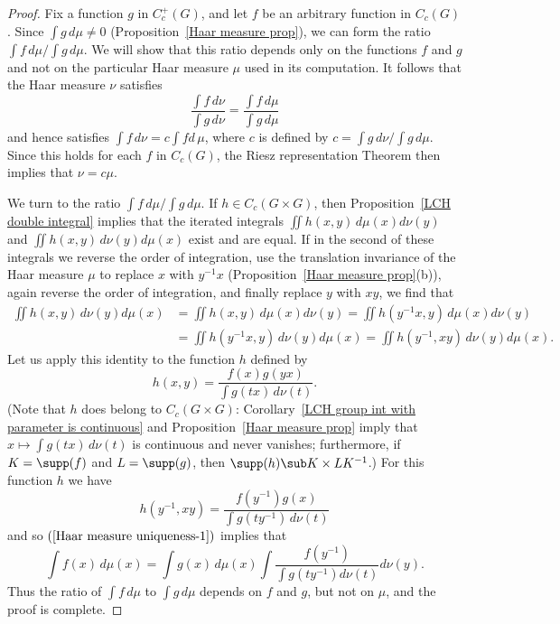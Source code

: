 \begin{proof}
Fix a function $g$ in $C_c^+(G)$, and let $f$ be an arbitrary function in $C_c(G)$. Since $\int g\,d\mu\neq 0$ (Proposition~\ref{Haar measure prop}), we can form the ratio $\int f\,d\mu/\int g\,d\mu$. We will show that this ratio depends only on the functions $f$ and $g$ and not on the particular Haar measure $\mu$ used in its computation. It follows that the
Haar measure $\nu$ satisfies
\[\frac{\int f\,d\nu}{\int g\,d\nu}=\frac{\int f\,d\mu}{\int g\,d\mu}\]
and hence satisfies $\int f\,d\nu=c\int fd\,\mu$, where $c$ is defined by $c=\int g\,d\nu/\int g\,d\mu$. Since this holds for each $f$ in $C_c(G)$, the Riesz representation Theorem then implies that $\nu=c\mu$.\par
We turn to the ratio $\int f\,d\mu/\int g\,d\mu$. If $h\in C_c(G\times G)$, then Proposition~\ref{LCH double integral} implies that the iterated integrals $\iint h(x,y)\,d\mu(x)d\nu(y)$ and $\iint h(x,y)\,d\nu(y)d\mu(x)$ exist and are equal. If in the second of these integrals we reverse the order of integration, use the translation invariance of the Haar measure $\mu$ to replace $x$ with $y^{-1}x$ (Proposition~\ref{Haar measure prop}(b)), again reverse the order of integration, and finally replace $y$ with $xy$, we find that
\begin{equation}\label{Haar measure uniqueness-1}
\begin{aligned}
\iint h(x,y)\,d\nu(y)d\mu(x)&=\iint h(x,y)\,d\mu(x)d\nu(y)=\iint h(y^{-1}x,y)\,d\mu(x)d\nu(y)\\
&=\iint h(y^{-1}x,y)\,d\nu(y)d\mu(x)=\iint h(y^{-1},xy)\,d\nu(y)d\mu(x).
\end{aligned}
\end{equation}
Let us apply this identity to the function $h$ defined by
\[h(x,y)=\frac{f(x)g(yx)}{\int g(tx)\,d\nu(t)}.\]
(Note that $h$ does belong to $C_c(G\times G)$: Corollary~\ref{LCH group int with parameter is continuous} and Proposition~\ref{Haar measure prop} imply that $x\mapsto\int g(tx)\,d\nu(t)$ is continuous and never vanishes; furthermore, if $K=\supp(f)$ and $L=\supp(g)$, then $\supp(h)\sub K\times LK^{-1}$.) For this function $h$ we have
\[h(y^{-1},xy)=\frac{f(y^{-1})g(x)}{\int g(ty^{-1})\,d\nu(t)}\]
and so $(\ref{Haar measure uniqueness-1})$ implies that
\[\int f(x)\,d\mu(x)=\int g(x)\,d\mu(x)\int\frac{f(y^{-1})}{\int g(ty^{-1})d\nu(t)}d\nu(y).\]
Thus the ratio of $\int f\,d\mu$ to $\int g\,d\mu$ depends on $f$ and $g$, but not on $\mu$, and the proof is complete.
\end{proof}
